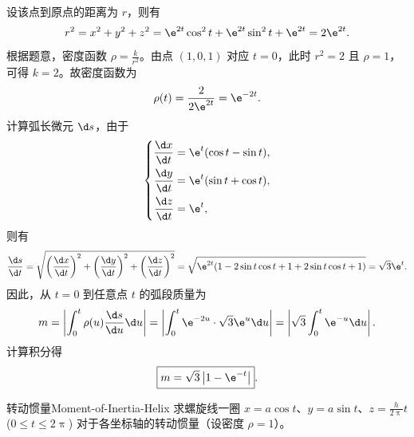 \begin{solution}
    设该点到原点的距离为 $r$，则有
    \begin{equation}
        r^2 = x^2 + y^2 + z^2 = \e^{2t} \cos^2 t + \e^{2t} \sin^2 t + \e^{2t} = 2\e^{2t}.
    \end{equation}
    根据题意，密度函数 $\rho = \frac{k}{r^2}$。由点 $(1, 0, 1)$ 对应 $t = 0$，此时 $r^2 = 2$ 且 $\rho = 1$，可得 $k = 2$。故密度函数为
    \begin{equation}
        \rho(t) = \frac{2}{2\e^{2t}} = \e^{-2t}.
    \end{equation}
    计算弧长微元 $\d s$，由于
    \begin{equation}
        \left\{ \begin{aligned}
            \frac{\d x}{\d t} & = \e^t (\cos t - \sin t), \\
            \frac{\d y}{\d t} & = \e^t (\sin t + \cos t), \\
            \frac{\d z}{\d t} & = \e^t,
        \end{aligned} \right.
    \end{equation}
    则有
    \begin{equation}
        \frac{\d s}{\d t} = \sqrt{\left(\frac{\d x}{\d t}\right)^2 + \left(\frac{\d y}{\d t}\right)^2 + \left(\frac{\d z}{\d t}\right)^2} = \sqrt{\e^{2t} (1 - 2\sin t \cos t + 1 + 2\sin t \cos t + 1)} = \sqrt{3}\e^t.
    \end{equation}
    因此，从 $t = 0$ 到任意点 $t$ 的弧段质量为
    \begin{equation}
        m = \left| \int_{0}^{t} \rho(u) \frac{\d s}{\d u} \d u \right| = \left| \int_{0}^{t} \e^{-2u} \cdot \sqrt{3}\e^u \d u \right| = \left| \sqrt{3} \int_{0}^{t} \e^{-u} \d u \right| .
    \end{equation}
    计算积分得
    \begin{equation}
        \boxed{m = \sqrt{3} \left|1 - \e^{-t}\right| }.
    \end{equation}
\end{solution}

\begin{problem}{转动惯量}{Moment-of-Inertia-Helix}
    求螺旋线一圈 $x = a \cos t$、$y = a \sin t$、$z = \frac{h}{2\uppi} t$ ($0 \leqslant t \leqslant 2\uppi$) 对于各坐标轴的转动惯量（设密度 $\rho = 1$）。
\end{problem}

